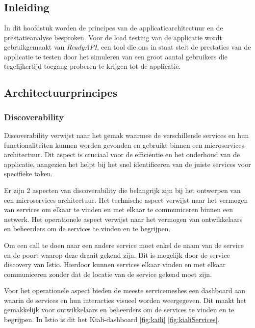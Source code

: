 \chapter{}
\label{ch:testen-prestatieanalyse}

\section{Inleiding}

In dit hoofdstuk worden de principes van de applicatiearchitectuur en de prestatieanalyse besproken. Voor de load testing van de applicatie wordt gebruikgemaakt van \textit{ReadyAPI}, een tool die ons in staat stelt de prestaties van de applicatie te testen door het simuleren van een groot aantal gebruikers die tegelijkertijd toegang proberen te krijgen tot de applicatie.

\section{Architectuurprincipes}

\subsection{Discoverability}

Discoverability verwijst naar het gemak waarmee de verschillende services en hun functionaliteiten kunnen worden gevonden en gebruikt binnen een microservices-architectuur. Dit aspect is cruciaal voor de efficiëntie en het onderhoud van de applicatie, aangezien het helpt bij het snel identificeren van de juiste services voor specifieke taken.

Er zijn 2 aspecten van discoverability die belangrijk zijn bij het ontwerpen van een microservices architectuur. Het technische aspect verwijst naar het vermogen van services om elkaar te vinden en met elkaar te communiceren binnen een netwerk. Het operationele aspect verwijst naar het vermogen van ontwikkelaars en beheerders om de services te vinden en te begrijpen.

Om een call te doen naar een andere service moet enkel de naam van de service en de poort waarop deze draait gekend zijn. Dit is mogelijk door de service discovery van Istio. Hierdoor kunnen services elkaar vinden en met elkaar communiceren zonder dat de locatie van de service gekend moet zijn.

Voor het operationele aspect bieden de meeste servicemeshes een dashboard aan waarin de services en hun interacties visueel worden weergegeven. Dit maakt het gemakkelijk voor ontwikkelaars en beheerders om de services te vinden en te begrijpen. In Istio is dit het Kiali-dashboard \ref{fig:kaili} \ref{fig:kialiServices}.

